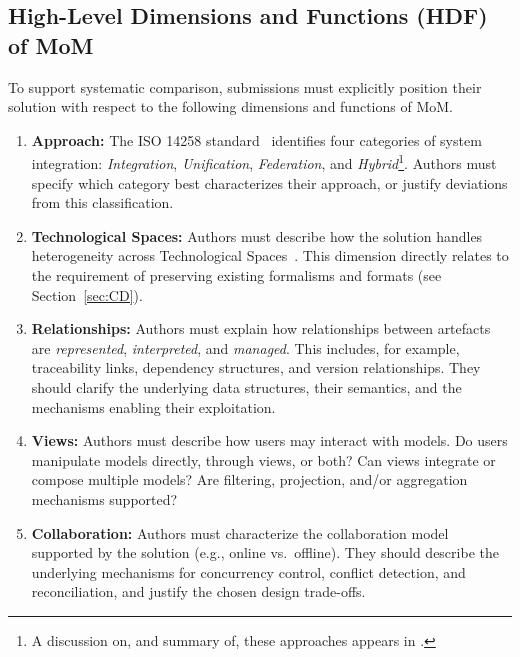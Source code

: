 \documentclass{article}
\begin{document}
\clearpage
\subsection{High-Level Dimensions and Functions (HDF) of MoM}
\label{sec:CS-HLDF}

To support systematic comparison, submissions must explicitly position their
solution with respect to the following dimensions and functions of MoM.

\begin{enumerate}[label=\textbf{HDF.\arabic*.}]

	\item \textbf{Approach:}  
   The ISO 14258 standard~\cite{ISO:14258-1998:2014} identifies four categories
   of system integration: \emph{Integration}, \emph{Unification},
   \emph{Federation}, and \emph{Hybrid}\footnote{A discussion on, and summary of, 
   these approaches appears in \cite{amrani2024survey}.}.  
   Authors must specify which category best characterizes their approach, or
   justify deviations from this classification.

	\item \textbf{Technological Spaces:}  
   Authors must describe how the solution handles heterogeneity across Technological
   Spaces~\cite{ivanov2002technological}. This dimension directly relates to
   the requirement of preserving existing formalisms and formats (see
   Section~\ref{sec:CD}).

	\item \textbf{Relationships:}  
   Authors must explain how relationships between artefacts are \emph{represented},
   \emph{interpreted}, and \emph{managed}. This includes, for example,
   traceability links, dependency structures, and version relationships.
   They should clarify the underlying data structures, their semantics,
   and the mechanisms enabling their exploitation.

	\item \textbf{Views:}  
   Authors must describe how users may interact with models. Do users manipulate models directly, through views, or both? Can views integrate or compose multiple models? Are filtering, projection, and/or aggregation mechanisms supported?
   
	\item \textbf{Collaboration:}  
   Authors must characterize the collaboration model supported by the solution (e.g.,
   online vs.\ offline). They should describe the underlying mechanisms
   for concurrency control, conflict detection, and reconciliation, and
   justify the chosen design trade-offs.
\end{enumerate}
\end{document}
